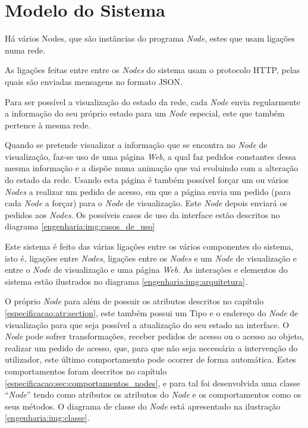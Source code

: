 \section{Modelo do Sistema}

Há vários Nodes, que são instâncias do programa \emph{Node}, estes que usam ligações numa rede.

As ligações feitas entre entre os \emph{Nodes} do sistema usam o protocolo \acs*{HTTP}, pelas quais são
enviadas mensagens no formato \acs*{JSON}.

Para ser possível a visualização do estado da rede, cada \emph{Node} envia regularmente a informação do
seu próprio estado para um \emph{Node} especial, este que também pertence à mesma rede.

Quando se pretende visualizar a informação que se encontra no \emph{Node} de visualização, faz-se uso de
uma página \emph{Web}, a qual faz pedidos constantes dessa mesma informação e a dispõe numa animação que 
vai evoluindo com a alteração do estado da rede. Usando esta página é também possível forçar um ou vários \emph{Nodes}
a realizar um pedido de acesso, em que a página envia um pedido (para cada \emph{Node} a forçar) para o \emph{Node} de visualização.
Este \emph{Node} depois enviará os pedidos aos \emph{Nodes}. Os possíveis casos de uso da interface estão descritos no diagrama \ref{engenharia:img:casos_de_uso}

Este sistema é feito das várias ligações entre os vários componentes do sistema, isto é,
ligações entre \emph{Nodes}, ligações entre os \emph{Nodes} e um \emph{Node} de visualização 
e entre o \emph{Node} de visualização e uma página \emph{Web}. As interações e elementos do sistema estão ilustrados no diagrama \ref{engenharia:img:arquitetura}.


O próprio \emph{Node} para além de possuir os atributos descritos no capítulo \ref{especificacao:atr:section}, este também possui um Tipo e o endereço do \emph{Node} de visualização para que 
seja possível a atualização do seu estado na interface.
O \emph{Node} pode sofrer transformações, receber pedidos de acesso ou o acesso ao objeto, realizar um pedido de acesso, que, para que não seja necessária a intervenção
do utilizador, este último comportamento pode ocorrer de forma automática.
Estes comportamentos foram descritos no capítulo \ref{especificacao:sec:comportamentos_nodes}, e para tal foi desenvolvida uma classe ``\emph{Node}'' tendo como atributos os atributos do \emph{Node}
e os comportamentos como os seus métodos. O diagrama de classe do \emph{Node} está apresentado na ilustração \ref{engenharia:img:classe}.

